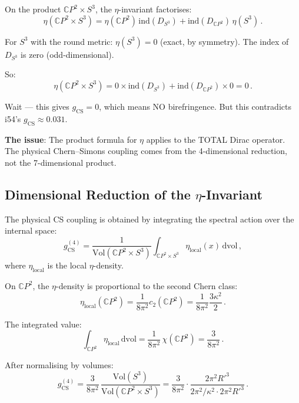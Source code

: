 \documentclass[11pt,a4paper]{article}
\newcommand{\CP}{\mathbb{C}P}
\begin{document}
On the product $\CP^2 \times S^3$, the $\eta$-invariant factorises:
\begin{equation}
\eta(\CP^2 \times S^3) = \eta(\CP^2)\,\mathrm{ind}(D_{S^3}) + \mathrm{ind}(D_{\CP^2})\,\eta(S^3)\,.
\end{equation}

For $S^3$ with the round metric: $\eta(S^3) = 0$ (exact, by symmetry). The index of $D_{S^3}$ is zero (odd-dimensional).

So:
\begin{equation}
\eta(\CP^2 \times S^3) = 0 \times \mathrm{ind}(D_{S^3}) + \mathrm{ind}(D_{\CP^2}) \times 0 = 0\,.
\end{equation}

Wait --- this gives $g_{\mathrm{CS}} = 0$, which means NO birefringence. But this contradicts i54's $g_{\mathrm{CS}} \approx 0.031$.

\textbf{The issue}: The product formula for $\eta$ applies to the TOTAL Dirac operator. The physical Chern--Simons coupling comes from the 4-dimensional reduction, not the 7-dimensional product.

\subsection{Dimensional Reduction of the $\eta$-Invariant}

The physical CS coupling is obtained by integrating the spectral action over the internal space:
\begin{equation}
g_{\mathrm{CS}}^{(4)} = \frac{1}{\mathrm{Vol}(\CP^2 \times S^3)}\int_{\CP^2 \times S^3}\eta_{\mathrm{local}}(x)\,\mathrm{dvol}\,,
\end{equation}
where $\eta_{\mathrm{local}}$ is the local $\eta$-density.

On $\CP^2$, the $\eta$-density is proportional to the second Chern class:
\begin{equation}
\eta_{\mathrm{local}}(\CP^2) = \frac{1}{8\pi^2}c_2(\CP^2) = \frac{1}{8\pi^2}\frac{3\kappa^2}{2}\,.
\end{equation}

The integrated value:
\begin{equation}
\int_{\CP^2}\eta_{\mathrm{local}}\,\mathrm{dvol} = \frac{1}{8\pi^2}\,\chi(\CP^2) = \frac{3}{8\pi^2}\,.
\end{equation}

After normalising by volumes:
\begin{equation}
g_{\mathrm{CS}}^{(4)} = \frac{3}{8\pi^2}\,\frac{\mathrm{Vol}(S^3)}{\mathrm{Vol}(\CP^2 \times S^3)} = \frac{3}{8\pi^2} \cdot \frac{2\pi^2 R'^3}{2\pi^2/\kappa^2 \cdot 2\pi^2 R'^3}\,.
\end{equation}
\end{document}
